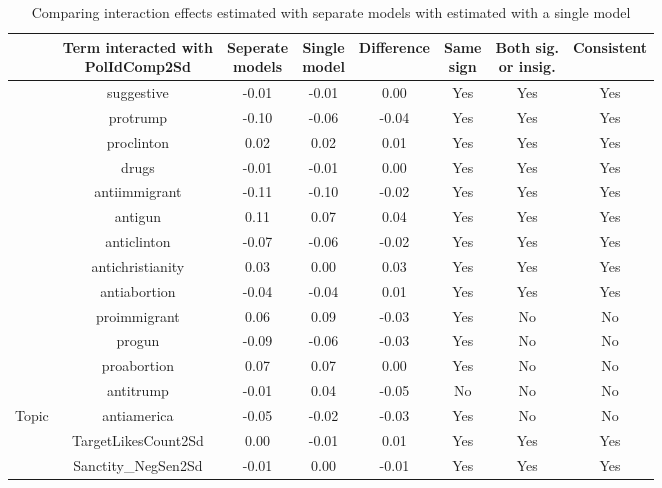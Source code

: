 \begin{table}[!h]
\centering
\caption{\label{tab:interaction-effects-comparison}Comparing interaction effects estimated with separate models with estimated with a single model}
\centering
\begin{tabular}[t]{lccccccc}
\toprule
 & \makecell[l]{Term interacted with\\PolIdComp2Sd} & \makecell[l]{Seperate\\models} & \makecell[l]{Single\\model} & Difference & \makecell[l]{Same\\sign} & \makecell[l]{Both sig.\\or insig.} & Consistent\\
\midrule
 & suggestive & -0.01 & -0.01 & 0.00 & Yes & Yes & Yes\\
\cmidrule{2-8}
 & protrump & -0.10 & -0.06 & -0.04 & Yes & Yes & Yes\\
\cmidrule{2-8}
 & proclinton & 0.02 & 0.02 & 0.01 & Yes & Yes & Yes\\
\cmidrule{2-8}
 & drugs & -0.01 & -0.01 & 0.00 & Yes & Yes & Yes\\
\cmidrule{2-8}
 & antiimmigrant & -0.11 & -0.10 & -0.02 & Yes & Yes & Yes\\
\cmidrule{2-8}
 & antigun & 0.11 & 0.07 & 0.04 & Yes & Yes & Yes\\
\cmidrule{2-8}
 & anticlinton & -0.07 & -0.06 & -0.02 & Yes & Yes & Yes\\
\cmidrule{2-8}
 & antichristianity & 0.03 & 0.00 & 0.03 & Yes & Yes & Yes\\
\cmidrule{2-8}
 & antiabortion & -0.04 & -0.04 & 0.01 & Yes & Yes & Yes\\
\cmidrule{2-8}
 & proimmigrant & 0.06 & 0.09 & -0.03 & Yes & No & No\\
\cmidrule{2-8}
 & progun & -0.09 & -0.06 & -0.03 & Yes & No & No\\
\cmidrule{2-8}
 & proabortion & 0.07 & 0.07 & 0.00 & Yes & No & No\\
\cmidrule{2-8}
 & antitrump & -0.01 & 0.04 & -0.05 & No & No & No\\
\cmidrule{2-8}
\multirow{-14}{*}{\raggedright\arraybackslash Topic} & antiamerica & -0.05 & -0.02 & -0.03 & Yes & No & No\\
\cmidrule{1-8}
 & TargetLikesCount2Sd & 0.00 & -0.01 & 0.01 & Yes & Yes & Yes\\
\cmidrule{2-8}
 & Sanctity_NegSen2Sd & -0.01 & 0.00 & -0.01 & Yes & Yes & Yes\\
\cmidrule{2-8}

\end{tabular}
\end{table}
